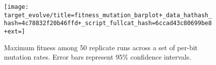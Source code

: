 \begin{figure*}
\begin{center}

\texttt{[image: target\_evolve/title=fitness\_mutation\_barplot+\_data\_hathash\_hash=4c78832f20b46ffd+\_script\_fullcat\_hash=6ccad43c80699be8+ext=]}
\caption{
Maximum fitness among 50 replicate runs across a set of per-bit mutation rates.
Error bars represent 95\% confidence intervals.
}
\label{fig:evolve_mutsweep}

\end{center}
\end{figure*}
